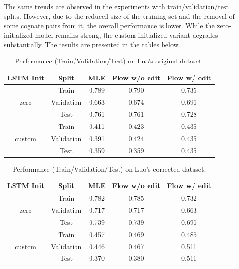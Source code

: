 The same trends are observed in the experiments with train/validation/test splits.
However, due to the reduced size of the training set and the removal of some cognate pairs from it, the overall performance is lower.
While the zero-initialized model remains strong, the custom-initialized variant degrades substantially.
The results are presented in the tables below.

\begin{table}[h!]
\centering
\begin{tabular}{|c|c|c|c|c|}
\hline
\textbf{LSTM Init} & \textbf{Split} & \textbf{MLE} & \textbf{Flow w/o edit} & \textbf{Flow w/ edit} \\
\hline
\multirow{3}{*}{zero}
& Train      & 0.789 & 0.790 & 0.735 \\
& Validation & 0.663 & 0.674 & 0.696 \\
& Test       & 0.761 & 0.761 & 0.728 \\
\hline
\multirow{3}{*}{custom}
& Train      & 0.411 & 0.423 & 0.435 \\
& Validation & 0.391 & 0.424 & 0.435 \\
& Test       & 0.359 & 0.359 & 0.435 \\
\hline
\end{tabular}
\caption{Performance (Train/Validation/Test) on Luo's original dataset.}
\end{table}

\begin{table}[h!]
\centering
\begin{tabular}{|c|c|c|c|c|}
\hline
\textbf{LSTM Init} & \textbf{Split} & \textbf{MLE} & \textbf{Flow w/o edit} & \textbf{Flow w/ edit} \\
\hline
\multirow{3}{*}{zero}
& Train      & 0.782 & 0.785 & 0.732 \\
& Validation & 0.717 & 0.717 & 0.663 \\
& Test       & 0.739 & 0.739 & 0.696 \\
\hline
\multirow{3}{*}{custom}
& Train      & 0.457 & 0.469 & 0.486 \\
& Validation & 0.446 & 0.467 & 0.511 \\
& Test       & 0.370 & 0.380 & 0.511 \\
\hline
\end{tabular}
\caption{Performance (Train/Validation/Test) on Luo's corrected dataset.}
\end{table}

